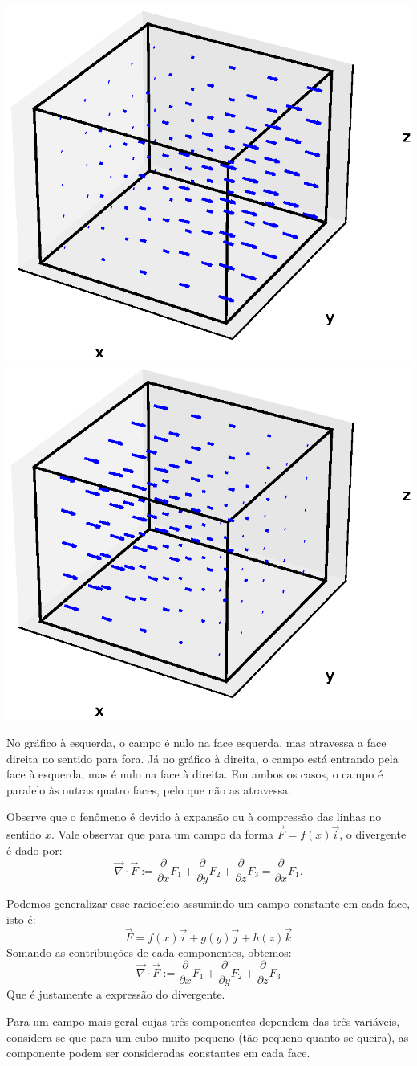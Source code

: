 \includegraphics[width=.5\textwidth]{cap_campos/figs/campo_com_cubo_divergente_positivo}\includegraphics[width=.5\textwidth]{cap_campos/figs/campo_com_cubo_divergente_negativo}  

No gráfico à esquerda, o campo é nulo na face esquerda, mas atravessa a face direita no sentido para fora. Já no gráfico à direita, o campo está entrando pela face à esquerda, mas é nulo na face à direita. Em ambos os casos, o campo é paralelo às outras quatro faces, pelo que não as atravessa.

Observe que o fenômeno é devido à expansão ou à compressão das linhas no sentido $x$. Vale observar que para um campo da forma $\vec{F}=f(x)\vec{i}$, o divergente é dado por:
$$\vec{\nabla}\cdot \vec{F} := \frac{\partial}{\partial x} F_1+ \frac{\partial}{\partial y} F_2+\frac{\partial}{\partial z} F_3 =\frac{\partial}{\partial x} F_1.$$

Podemos generalizar esse raciocício assumindo um campo constante em cada face, isto é:
$$\vec{F} = f(x)\vec{i} + g(y)\vec{j} + h(z)\vec{k}$$
Somando as contribuições de cada  componentes, obtemos:
$$\vec{\nabla}\cdot \vec{F} := \frac{\partial}{\partial x} F_1+ \frac{\partial}{\partial y} F_2+\frac{\partial}{\partial z} F_3$$
Que é justamente a expressão do divergente.

Para um campo mais geral cujas três componentes dependem das três variáveis, considera-se que para um cubo muito pequeno (tão pequeno quanto se queira), as componente podem ser consideradas constantes em cada face.


